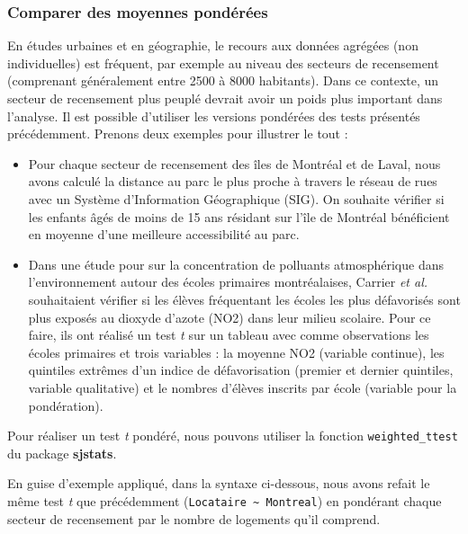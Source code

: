 \documentclass[
  11pt,
  french,
]{book}
\makeatletter
\newenvironment{kframev}{%
\medskip{}
\setlength{\fboxsep}{.8em}
 \def\at@end@of@kframev{}%
 \ifinner\ifhmode%
  \def\at@end@of@kframev{\end{minipage}}%
  \begin{minipage}{\columnwidth}%
 \fi\fi%
 \def\FrameCommand##1{\hskip\@totalleftmargin \hskip-\fboxsep
 \colorbox{shadebluecolor}{##1}\hskip-\fboxsep
     \hskip-\linewidth \hskip-\@totalleftmargin \hskip\columnwidth}%
 \MakeFramed {\advance\hsize-\width
   \@totalleftmargin\z@ \linewidth\hsize
   \@setminipage}}%
 {\par\unskip\endMakeFramed%
 \at@end@of@kframev}
\newenvironment{rmdblock}[1]
  {
  \begin{itemize}
  \renewcommand{\labelitemi}{
    \raisebox{-.7\height}[0pt][0pt]{
      {\setkeys{Gin}{width=3em,keepaspectratio}\texttt{[image: images/\#1]}}
    }
  }
  \setlength{\fboxsep}{1em}
  \begin{kframev}
  \small
  \item
  }
  {
  \end{kframev}
  \end{itemize}
  }
\newenvironment{bloc_objectif}
  {\begin{rmdblock}{objectif}}
  {\end{rmdblock}}
\makeatother
\begin{document}
\hypertarget{sect04314}{%
\subsubsection{Comparer des moyennes pondérées}\label{sect04314}}

\begin{bloc_objectif}

En études urbaines et en géographie, le recours aux données agrégées (non individuelles) est fréquent, par exemple au niveau des secteurs de recensement (comprenant généralement entre 2500 à 8000 habitants). Dans ce contexte, un secteur de recensement plus peuplé devrait avoir un poids plus important dans l'analyse. Il est possible d'utiliser les versions pondérées des tests présentés précédemment. Prenons deux exemples pour illustrer le tout :

\begin{itemize}
\item
  Pour chaque secteur de recensement des îles de Montréal et de Laval, nous avons calculé la distance au parc le plus proche à travers le réseau de rues avec un Système d'Information Géographique (SIG). On souhaite vérifier si les enfants âgés de moins de 15 ans résidant sur l'île de Montréal bénéficient en moyenne d'une meilleure accessibilité au parc.
\item
  Dans une étude pour sur la concentration de polluants atmosphérique dans l'environnement autour des écoles primaires montréalaises, Carrier \emph{et al.} \citeyearpar{carrier2014} souhaitaient vérifier si les élèves fréquentant les écoles les plus défavorisés sont plus exposés au dioxyde d'azote (NO2) dans leur milieu scolaire. Pour ce faire, ils ont réalisé un test \emph{t} sur un tableau avec comme observations les écoles primaires et trois variables : la moyenne NO2 (variable continue), les quintiles extrêmes d'un indice de défavorisation (premier et dernier quintiles, variable qualitative) et le nombres d'élèves inscrits par école (variable pour la pondération).
\end{itemize}

Pour réaliser un test \emph{t} pondéré, nous pouvons utiliser la fonction \texttt{weighted\_ttest} du package \textbf{sjstats}.

\end{bloc_objectif}

En guise d'exemple appliqué, dans la syntaxe ci-dessous, nous avons refait le même test \emph{t} que précédemment (\texttt{Locataire\ \textasciitilde{}\ Montreal}) en pondérant chaque secteur de recensement par le nombre de logements qu'il comprend.
\end{document}
